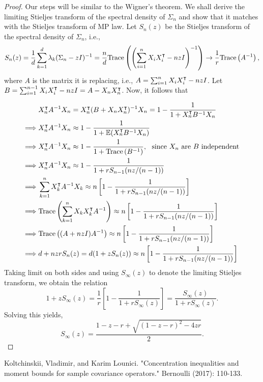 \documentclass[12pt]{article}
\begin{document}
\begin{proof}
    Our steps will be similar to the Wigner's theorem. We shall derive the limiting Stieljes transform of the spectral density of $\Sigma_n$ and show that it matches with the Stieljes transform of MP law. Let $S_n(z)$ be the Stieljes transform of the spectral density of $\Sigma_n$, i.e.,
    \begin{equation*}
        S_n(z) 
        = \dfrac{1}{d}\sum_{k=1}^d \lambda_k(\Sigma_n - zI)^{-1}
        = \dfrac{n}{d}\text{\normalfont Trace}\left(  \left(\sum_{i=1}^n X_i X_i^{\intercal} - nzI\right)^{-1}  \right)
        \rightarrow \dfrac{1}{r}\text{\normalfont Trace}\left( A^{-1} \right),
    \end{equation*}
    \noindent where $A$ is the matrix it is replacing, i.e., $A = \sum_{i=1}^n X_i X_i^{\intercal} - nzI$. Let $B = \sum_{i=1}^{n-1} X_i X_i^{\intercal} - nzI = A - X_nX_n^{\intercal}$. Now, it follows that

    \begin{align*}
        & X_n^{\intercal} A^{-1}X_n = X_n^{\intercal} (B + X_nX_n^{\intercal})^{-1}X_n = 1 - \dfrac{1}{1 + X_n^{\intercal} B^{-1} X_n} \\
        \implies & X_n^{\intercal} A^{-1}X_n \approx 1 - \dfrac{1}{1 + \mathbb{E}(X_n^{\intercal} B^{-1}X_n ) }\\
        \implies & X_n^{\intercal} A^{-1}X_n \approx 1 - \dfrac{1}{1 + \text{\normalfont Trace}\left( B^{-1} \right)}, \ \text{ since } X_n \text{ are } B \text{ independent }\\
        \implies & X_n^{\intercal} A^{-1}X_n \approx 1 - \dfrac{1}{1 +  rS_{n-1}(nz/(n-1)) } \\
        \implies & \sum_{k=1}^n X_k^{\intercal} A^{-1}X_k \approx n \left[ 1 - \dfrac{1}{1 +  rS_{n-1}(nz/(n-1)) } \right]\\
        \implies & \text{\normalfont Trace}\left( \sum_{k=1}^n X_kX_k^{\intercal}  A^{-1} \right) \approx n \left[ 1 - \dfrac{1}{1 +  rS_{n-1}(nz/(n-1)) } \right]\\
        \implies & \text{\normalfont Trace}\left( (A + nzI)A^{-1} \right) \approx n \left[ 1 - \dfrac{1}{1 +  rS_{n-1}(nz/(n-1)) } \right]\\
        \implies & d + nzr S_n(z) = d (1 + zS_n(z)) \approx n \left[ 1 - \dfrac{1}{1 +  rS_{n-1}(nz/(n-1)) } \right]
    \end{align*}
    \noindent Taking limit on both sides and using $S_{\infty}(z)$ to denote the limiting Stieljes transform, we obtain the relation
    \begin{equation*}
        1 + z S_\infty(z) = \dfrac{1}{r}\left[ 1 - \dfrac{1}{1 + rS_\infty(z)} \right] = \dfrac{S_\infty(z)}{1 + rS_\infty(z)}.
    \end{equation*}
    \noindent Solving this yields,
    \begin{equation*}
        S_\infty(z) = \dfrac{1 - z - r + \sqrt{(1 - z - r)^2 - 4zr} }{2}.
    \end{equation*}
\end{proof}




\pagebreak


\begin{thebibliography}{99}
     Koltchinskii, Vladimir, and Karim Lounici. "Concentration inequalities and moment bounds for sample covariance operators." Bernoulli (2017): 110-133.
\end{thebibliography}
\end{document}
